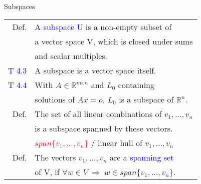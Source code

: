 \begin{mainbox}{Subspaces}
\setlength{\tabcolsep}{2pt}
\begin{tabular}{rl}
	Def. & A \textcolor{blue}{subspace U} is a non-empty subset of\\
	& a vector space V, which is closed under sums\\
	& and scalar multiples.\\
	\rule{0pt}{3ex} 
	\textcolor{blue}{T 4.3} & A subspace is a vector space itself.\\
	\rule{0pt}{3ex} 
	\textcolor{blue}{T 4.4} & With $A\in\mathbb{R}^{mxn}$ and $L_0$ containing \\
	& solutions of $Ax = o$, $L_0$ is a subspace of $\mathbb{R}^n$.\\
	\rule{0pt}{3ex} 
	Def. & The set of all linear combinations of $v_1, ..., v_n$\\
	& is a subspace spanned by these vectors.\\
	& \textcolor{red}{$span\{v_1, ..., v_n\}$} / linear hull of $v_1, ..., v_n$\\
	Def. & The vectors $v_1, ..., v_n$ are a \textcolor{blue}{spanning set}\\
	& of V, if $\forall w \in V\:\Rightarrow\;w\in span\{v_1, ..., v_n\}$.
\end{tabular}
\end{mainbox}

